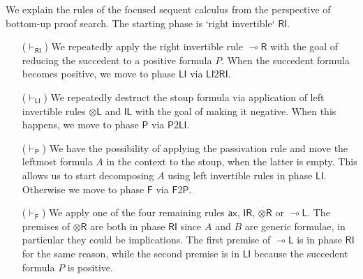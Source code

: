\documentclass[submission,copyright,creativecommons]{eptcs}
\theoremstyle{definition}
\newcommand{\tl}{\otimes \mathsf{L}}
\newcommand{\tr}{\otimes \mathsf{R}}
\newcommand{\lright}{{\multimap}\mathsf{R}}
\newcommand{\lleft}{{\multimap}\mathsf{L}}
\newcommand{\pass}{\mathsf{pass}}
\newcommand{\unitl}{\mathsf{IL}}
\newcommand{\unitr}{\mathsf{IR}}
\newcommand{\ax}{\mathsf{ax}}
\newcommand{\RI}{\mathsf{RI}}
\newcommand{\LI}{\mathsf{LI}}
\newcommand{\Pass}{\mathsf{P}}
\newcommand{\F}{\mathsf{F}}
\begin{document}
We explain the rules of the focused sequent calculus from the perspective of bottom-up proof search. The starting phase is `right invertible` $\RI$. %
\begin{itemize}
\item[($\vdash_\RI$)] We repeatedly apply the right invertible rule $\lright$ with the goal of reducing the succedent to a positive formula $P$.
  When the succedent formula becomes positive, we move to phase $\LI$ via $\LI2\RI$.
\item[($\vdash_\LI$)] We repeatedly destruct the stoup formula via application of left invertible rules $\tl$ and $\unitl$ with the goal of making it negative. When this happens, we move to phase $\Pass$ via $\Pass2\LI$.
\item[($\vdash_\Pass$)] We have the possibility of applying the passivation rule and move the leftmost formula $A$ in the context to the stoup, when the latter is empty. This allows us to start decomposing $A$ using left invertible rules in phase $\LI$. Otherwise we move to phase $\F$ via $\F2\Pass$.
\item[($\vdash_\F$)] We apply one of the four remaining rules $\ax$, $\unitr$, $\tr$ or $\lleft$. The premises of $\tr$ are both in phase $\RI$ since $A$ and $B$ are generic formulae, in particular they could be implications. The first premise of $\lleft$ is in phase $\RI$ for the same reason, while the second premise is in $\LI$ because the succedent formula $P$ is positive.
\end{itemize}
\end{document}
